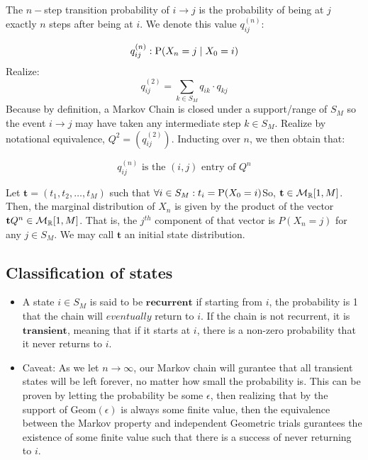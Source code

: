 \begin{definition} The $n-$step transition probability of $i \to j$ is the probability of being at $j$ exactly $n$ steps after being at $i$. We denote this value $q_{ij}^{(n)}:$
\end{definition}

$$ q_{ij}^{(n)}: \text{P}(X_n = j \mid X_0 = i)$$
Realize:
$$q_{ij}^{(2)} = \sum_{k \in S_M} q_{ik}\cdot q_{kj}$$
Because by definition, a Markov Chain is closed under a support/range of $S_M$ so the event $i \to j$ may have taken any intermediate step $k \in S_M$. Realize by notational equivalence, $Q^2 = (q_{ij}^{(2)})$. Inducting over $n$, we then obtain that:

$$q_{ij}^{(n)} \text{ is the } (i,j) \text{ entry of } Q^n$$

\begin{definition} Let $\textbf{t} = (t_1,t_2,\dots,t_M)$ such that $\forall i \in S_M : t_i = \text{P}(X_0 = i)$So, $\textbf{t} \in \mathcal{M}_{\mathbb{R}}[1,M]$. Then, the marginal distribution of $X_n$ is given by the product of the vector $\textbf{t} Q^n \in \mathcal{M}_{\mathbb{R}}[1,M]$. That is, the $j^{th}$ component of that vector is $P(X_n = j)$ for any $j \in S_M$. We may call $\textbf{t}$ an initial state distribution.
\end{definition}

\subsection{Classification of states}

\begin{itemize}
\item A state $i \in S_M$ is said to be $\textbf{recurrent}$ if starting from $i$, the probability is 1 that the chain will $\textit{eventually}$ return to $i$. If the chain is not recurrent, it is $\textbf{transient}$, meaning that if it starts at $i$, there is a non-zero probability that it never returns to $i$.

\item Caveat: As we let $n \to \infty$, our Markov chain will gurantee that all transient states will be left forever, no matter how small the probability is. This can be proven by letting the probability be some $\epsilon$, then realizing that by the support of $\text{Geom}(\epsilon)$ is always some finite value, then the equivalence between the Markov property and independent Geometric trials gurantees the existence of some finite value such that there is a success of never returning to $i$.
\end{itemize}

